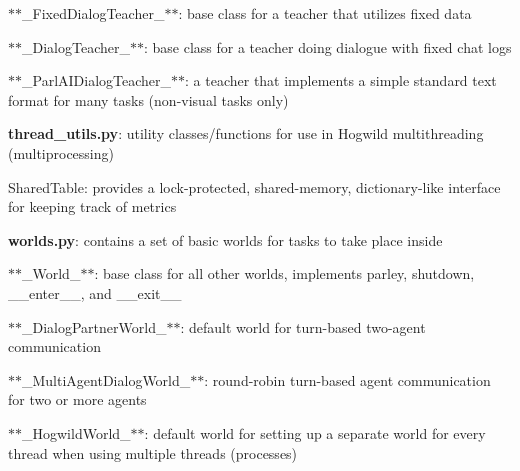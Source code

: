 \begin{DoxyItemize}
\begin{DoxyItemize}
\item $\ast$$\ast$\+\_\+\+Fixed\+Dialog\+Teacher\+\_\+$\ast$$\ast$\+: base class for a teacher that utilizes fixed data
\item $\ast$$\ast$\+\_\+\+Dialog\+Teacher\+\_\+$\ast$$\ast$\+: base class for a teacher doing dialogue with fixed chat logs
\item $\ast$$\ast$\+\_\+\+Parl\+A\+I\+Dialog\+Teacher\+\_\+$\ast$$\ast$\+: a teacher that implements a simple standard text format for many tasks (non-\/visual tasks only)
\end{DoxyItemize}
\item {\bfseries thread\+\_\+utils.\+py}\+: utility classes/functions for use in Hogwild multithreading (multiprocessing)
\begin{DoxyItemize}
\item Shared\+Table\+: provides a lock-\/protected, shared-\/memory, dictionary-\/like interface for keeping track of metrics
\end{DoxyItemize}
\item {\bfseries worlds.\+py}\+: contains a set of basic worlds for tasks to take place inside
\begin{DoxyItemize}
\item $\ast$$\ast$\+\_\+\+World\+\_\+$\ast$$\ast$\+: base class for all other worlds, implements {\ttfamily parley}, {\ttfamily shutdown}, {\ttfamily \+\_\+\+\_\+enter\+\_\+\+\_\+}, and {\ttfamily \+\_\+\+\_\+exit\+\_\+\+\_\+}
\item $\ast$$\ast$\+\_\+\+Dialog\+Partner\+World\+\_\+$\ast$$\ast$\+: default world for turn-\/based two-\/agent communication
\item $\ast$$\ast$\+\_\+\+Multi\+Agent\+Dialog\+World\+\_\+$\ast$$\ast$\+: round-\/robin turn-\/based agent communication for two or more agents
\item $\ast$$\ast$\+\_\+\+Hogwild\+World\+\_\+$\ast$$\ast$\+: default world for setting up a separate world for every thread when using multiple threads (processes) 
\end{DoxyItemize}
\end{DoxyItemize}